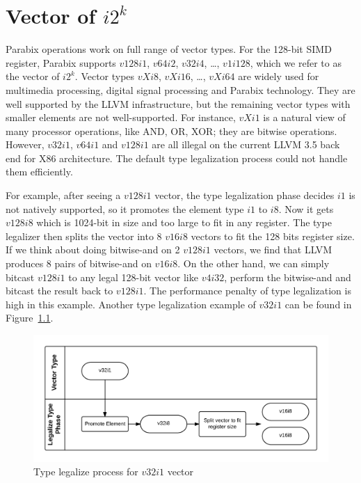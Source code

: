 %
%

\chapter{Vector of $i2^k$}
\label{four}

Parabix operations work on full range of vector types. For the 128-bit SIMD register, Parabix supports $v128i1$, $v64i2$, $v32i4$, \ldots, $v1i128$, which we refer to as the vector of $i2^k$. Vector types $vXi8$, $vXi16$, \ldots, $vXi64$ are widely used for multimedia processing, digital signal processing and Parabix technology. They are well supported by the LLVM infrastructure, but the remaining vector types with smaller elements are not well-supported. For instance, $vXi1$ is a natural view of many processor operations, like AND, OR, XOR; they are bitwise operations. However, $v32i1$, $v64i1$ and $v128i1$ are all illegal on the current LLVM 3.5 back end for X86 architecture. The default type legalization process could not handle them efficiently.

For example, after seeing a $v128i1$ vector, the type legalization phase decides $i1$ is not natively supported, so it promotes the element type $i1$ to $i8$. Now it gets $v128i8$ which is 1024-bit in size and too large to fit in any register. The type legalizer then splits the vector into 8 $v16i8$ vectors to fit the 128 bits register size. If we think about doing bitwise-and on 2 $v128i1$ vectors, we find that LLVM produces 8 pairs of bitwise-and on $v16i8$. On the other hand, we can simply bitcast $v128i1$ to any legal 128-bit vector like $v4i32$, perform the bitwise-and and bitcast the result back to $v128i1$. The performance penalty of type legalization is high in this example. Another type legalization example of $v32i1$ can be found in Figure~\ref{figure:v32i1_legalize_type}.

\begin{figure}[ht!]
  \centering
  \includegraphics[width=140mm]{draw/v32i1_legalize_type.png}
  \caption{Type legalize process for $v32i1$ vector}
  \label{figure:v32i1_legalize_type}
\end{figure}

